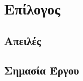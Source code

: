 \documentclass[../main.tex]{subfiles}
\begin{document}
    

\section{Επίλογος}

\subsection{Απειλές}
\subsection{Σημασία Έργου}
\clearpage
\end{document}
